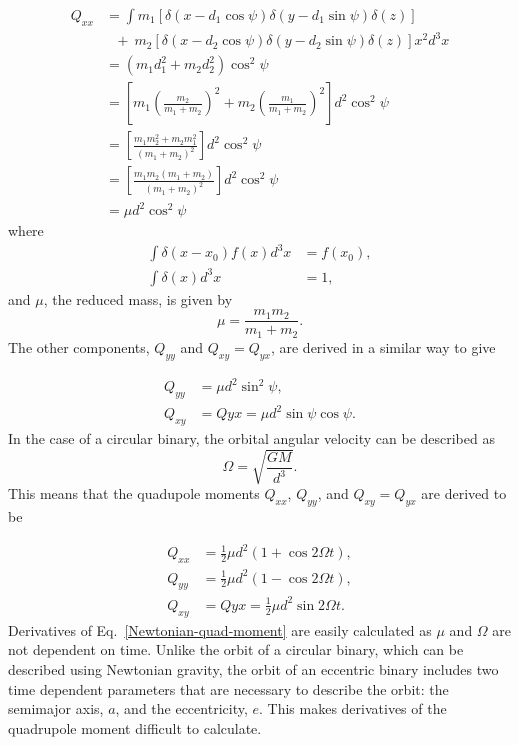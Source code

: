 \begin{equation}\label{Qxx-gr}
\begin{split}
    Q_{xx} &= \int m_1[\delta(x-d_1\cos\psi)\delta(y-d_1\sin\psi)\delta(z)] \\
        &~~~+~m_2[\delta(x-d_2\cos\psi)\delta(y-d_2\sin\psi)\delta(z)]x^2d^3x \\
    &= (m_1d_1^2 + m_2d_2^2)\cos^2\psi \\
    &= \left[m_1\left( \frac{m_2}{m_1+m_2}\right)^2 + m_2\left( \frac{m_1}{m_1+m_2}\right)^2\right]d^2\cos^2\psi \\
    &= \left[ \frac{m_1m_2^2+m_2m_1^2}{(m_1+m_2)^2}\right]d^2\cos^2\psi \\
    &= \left[ \frac{m_1m_2(m_1+m_2)}{(m_1+m_2)^2}\right]d^2\cos^2\psi \\
    &= \mu d^2\cos^2\psi 
\end{split}
\end{equation}
where
\begin{equation}
    \begin{split}
        \int\delta(x-x_0)f(x)d^3x &= f(x_0), \\
        \int\delta(x)d^3x &= 1,
    \end{split}
\end{equation}
and $\mu$, the reduced mass, is given by
\begin{equation}\label{mu}
    \mu = \frac{m_1m_2}{m_1+m_2}.
\end{equation}
The other components, $Q_{yy}$ and $Q_{xy} = Q_{yx}$, are derived in a similar way to give

\begin{equation}\label{GR-quad-moment}
    \begin{split}
        Q_{yy} &= \mu d^2\sin^2{\psi}, \\
        Q_{xy} &= Q{yx} = \mu d^2 \sin{\psi}\cos{\psi}.
    \end{split}
\end{equation}
In the case of a circular binary, the orbital angular velocity can be described as
\begin{equation}
    \Omega = \sqrt{\frac{GM}{d^3}}.
\end{equation}
This means that the quadupole moments $Q_{xx}$, $Q_{yy}$, and $Q_{xy} = Q_{yx}$ are derived to be

\begin{equation}\label{Newtonian-quad-moment}
    \begin{split}
       Q_{xx} &= \frac{1}{2}\mu d^2(1 + \cos2\Omega t), \\
        Q_{yy} &= \frac{1}{2}\mu d^2(1 - \cos2\Omega t), \\
        Q_{xy} &= Q{yx} = \frac{1}{2}\mu d^2\sin2\Omega t.
    \end{split}
\end{equation}
Derivatives of Eq.~\ref{Newtonian-quad-moment} are easily calculated as $\mu$ and $\Omega$ are not dependent on time. Unlike the orbit of a circular binary, which can be described using Newtonian gravity, the orbit of an eccentric binary includes two time dependent parameters that are necessary to describe the orbit: the semimajor axis, $a$, and the eccentricity, $e$. This makes derivatives of the quadrupole moment difficult to calculate.

